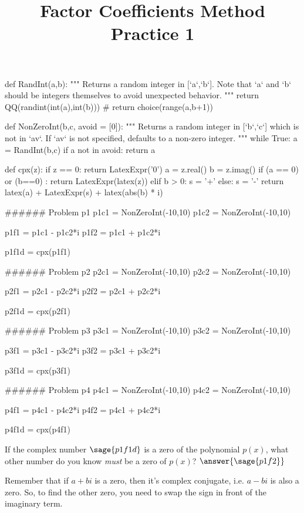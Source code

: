 \documentclass{ximera}
\title{Factor Coefficients Method Practice 1}
\begin{document}
%

\begin{sagesilent}
def RandInt(a,b):
    """ Returns a random integer in [`a`,`b`]. Note that `a` and `b` should be integers themselves to avoid unexpected behavior.
    """
    return QQ(randint(int(a),int(b)))
    # return choice(range(a,b+1))

def NonZeroInt(b,c, avoid = [0]):
    """ Returns a random integer in [`b`,`c`] which is not in `av`.
        If `av` is not specified, defaults to a non-zero integer.
    """
    while True:
        a = RandInt(b,c)
        if a not in avoid:
            return a


def cpx(z):
    if z == 0:
        return LatexExpr('0')
    a = z.real()
    b = z.imag()
    if (a == 0) or (b==0) :
        return LatexExpr(latex(z))
    elif b > 0:
      s = '+'
    else:
      s = '-'
    return latex(a) + LatexExpr(s) + latex(abs(b) * i)



###### Problem p1
p1c1 = NonZeroInt(-10,10)
p1c2 = NonZeroInt(-10,10)

p1f1 = p1c1 - p1c2*i
p1f2 = p1c1 + p1c2*i

p1f1d = cpx(p1f1)

###### Problem p2
p2c1 = NonZeroInt(-10,10)
p2c2 = NonZeroInt(-10,10)

p2f1 = p2c1 - p2c2*i
p2f2 = p2c1 + p2c2*i

p2f1d = cpx(p2f1)

###### Problem p3
p3c1 = NonZeroInt(-10,10)
p3c2 = NonZeroInt(-10,10)

p3f1 = p3c1 - p3c2*i
p3f2 = p3c1 + p3c2*i

p3f1d = cpx(p3f1)

###### Problem p4
p4c1 = NonZeroInt(-10,10)
p4c2 = NonZeroInt(-10,10)

p4f1 = p4c1 - p4c2*i
p4f2 = p4c1 + p4c2*i

p4f1d = cpx(p4f1)


\end{sagesilent}

\begin{problem}
    If the complex number $\sage{p1f1d}$ is a zero of the polynomial $p(x)$, what other number do you know \emph{must} be a zero of $p(x)$? $\answer{\sage{p1f2}}$
    \begin{feedback}
        Remember that if $a + bi$ is a zero, then it's complex conjugate, i.e. $a - bi$ is also a zero. So, to find the other zero, you need to swap the sign in front of the imaginary term.
    \end{feedback}
    
\end{problem}
\end{document}
